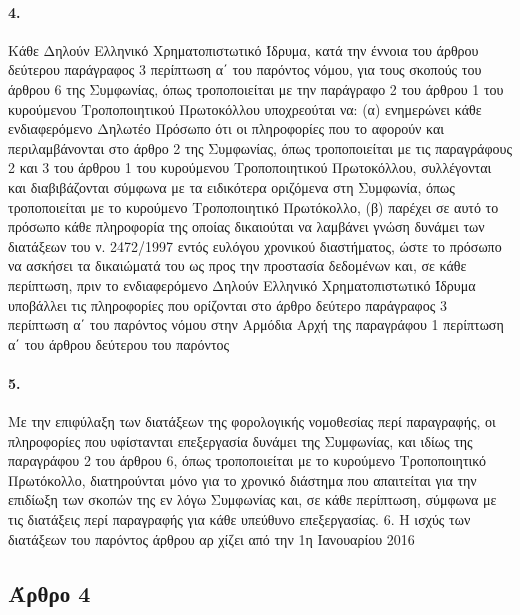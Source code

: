 \documentclass[a4paper,oneside, 10pt]{book}
\begin{document}
\paragraph { 4. } Κάθε Δηλούν Ελληνικό Χρηματοπιστωτικό Ίδρυμα, κατά την έννοια του άρθρου δεύτερου παράγραφος 3 περίπτωση α΄ του παρόντος νόμου, για τους σκοπούς του άρθρου 6 της Συμφωνίας, όπως τροποποιείται με  την παράγραφο 2 του άρθρου 1 του κυρούμενου Τροποποιητικού Πρωτοκόλλου υποχρεούται να:  (α) ενημερώνει κάθε ενδιαφερόμενο Δηλωτέο Πρόσωπο ότι οι πληροφορίες που το αφορούν και περιλαμβάνονται στο άρθρο 2 της Συμφωνίας, όπως τροποποιείται με τις παραγράφους 2 και 3 του άρθρου 1 του κυρούμενου Τροποποιητικού Πρωτοκόλλου, συλλέγονται και διαβιβάζονται σύμφωνα με τα ειδικότερα οριζόμενα στη Συμφωνία, όπως τροποποιείται με το κυρούμενο Τροποποιητικό Πρωτόκολλο,  (β) παρέχει σε αυτό το πρόσωπο κάθε πληροφορία της οποίας δικαιούται να λαμβάνει γνώση δυνάμει των διατάξεων του ν. 2472/1997 εντός ευλόγου χρονικού διαστήματος, ώστε το πρόσωπο να ασκήσει τα δικαιώματά του ως προς την προστασία δεδομένων και, σε κάθε περίπτωση, πριν το ενδιαφερόμενο Δηλούν Ελληνικό Χρηματοπιστωτικό Ίδρυμα υποβάλλει τις πληροφορίες που ορίζονται στο άρθρο δεύτερο παράγραφος 3 περίπτωση α΄ του παρόντος νόμου στην Αρμόδια Αρχή της παραγράφου 1 περίπτωση α΄ του άρθρου δεύτερου του παρόντος
\paragraph { 5. } Με την επιφύλαξη των διατάξεων της φορολογικής νομοθεσίας περί παραγραφής, οι πληροφορίες που υφίστανται επεξεργασία δυνάμει της Συμφωνίας, και ιδίως της παραγράφου 2 του άρθρου 6, όπως τροποποιείται με το κυρούμενο Τροποποιητικό Πρωτόκολλο, διατηρούνται μόνο για το χρονικό διάστημα που απαιτείται για την επιδίωξη των σκοπών της εν λόγω Συμφωνίας και, σε κάθε περίπτωση, σύμφωνα με τις διατάξεις περί παραγραφής για κάθε υπεύθυνο επεξεργασίας.   6. Η ισχύς των διατάξεων του παρόντος άρθρου αρ χίζει από την 1η Ιανουαρίου 2016
\subsection*{ Άρθρο 4 }
\end{document}
